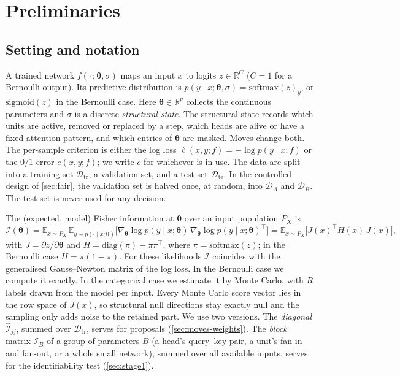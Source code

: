 \documentclass[11pt,a4paper]{article}
\theoremstyle{definition}
\newcommand{\R}{\mathbb{R}}
\newcommand{\E}{\mathbb{E}}
\newcommand{\D}{\mathcal{D}}
\newcommand{\bth}{\boldsymbol\theta}
\newcommand{\Fis}{\mathcal{I}}
\newcommand{\Fhat}{\widehat{\Fis}}
\newcommand{\Dtr}{\D_{\mathrm{tr}}}
\newcommand{\DA}{\D_{A}}
\newcommand{\DB}{\D_{B}}
\newcommand{\Dte}{\D_{\mathrm{te}}}
\begin{document}
\section{Preliminaries}
\label{sec:prelim}

\subsection{Setting and notation}
\label{sec:setting}

A trained network $f(\cdot\,;\bth,\sigma)$ maps an input $x$ to logits $z\in\R^{C}$
($C=1$ for a Bernoulli output). Its predictive distribution is
$p(y\mid x;\bth,\sigma)=\mathrm{softmax}(z)_y$, or $\mathrm{sigmoid}(z)$ in the
Bernoulli case. Here $\bth\in\R^{p}$ collects the continuous parameters and $\sigma$
is a discrete \emph{structural state}. The structural state records which units are
active, removed or replaced by a step, which heads are alive or have a fixed
attention pattern, and which entries of $\bth$ are masked. Moves change both. The
per-sample criterion is either the log loss $\ell(x,y;f)=-\log p(y\mid x;f)$ or the
$0/1$ error $e(x,y;f)$; we write $c$ for whichever is in use. The data are split into
a training set $\Dtr$, a validation set, and a test set $\Dte$. In the controlled
design of \cref{sec:fair}, the validation set is halved once, at random, into $\DA$
and $\DB$. The test set is never used for any decision.

The (expected, model) Fisher information at $\bth$ over an input population $P_X$ is
\begin{equation}
\Fis(\bth)=\E_{x\sim P_X}\,\E_{y\sim p(\cdot\mid x;\bth)}
\big[\nabla_{\bth}\log p(y\mid x;\bth)\,\nabla_{\bth}\log p(y\mid x;\bth)^{\!\top}\big]
=\E_{x\sim P_X}\big[J(x)^{\top}H(x)\,J(x)\big],
\label{eq:fisher}
\end{equation}
with $J=\partial z/\partial\bth$ and $H=\mathrm{diag}(\pi)-\pi\pi^{\top}$, where
$\pi=\mathrm{softmax}(z)$; in the Bernoulli case $H=\pi(1-\pi)$. For these likelihoods
$\Fis$ coincides with the generalised Gauss--Newton matrix of the log loss. In the
Bernoulli case we compute it exactly. In the categorical case we estimate it by Monte
Carlo, with $R$ labels drawn from the model per input. Every Monte Carlo score vector
lies in the row space of $J(x)$, so structural null directions stay exactly null
and the sampling only adds noise to the retained part. We use two versions. The
\emph{diagonal} $\Fhat_{jj}$, summed over $\Dtr$, serves for proposals
(\cref{sec:moves-weights}). The \emph{block} matrix $\Fis_B$ of a group of parameters
$B$ (a head's query--key pair, a unit's fan-in and fan-out, or a whole small
network), summed over all available inputs, serves for the identifiability test
(\cref{sec:stage1}).
\end{document}
